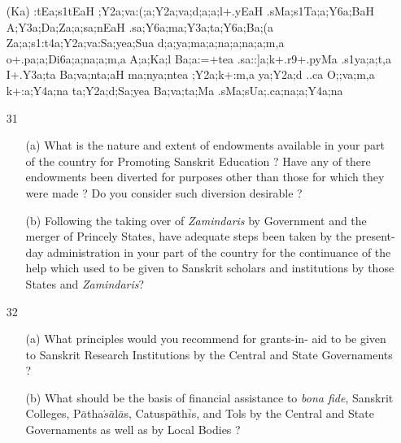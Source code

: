 \begin{itemize}
\begin{itemize}
            \item[({\sktf Ka})] {\sktf :tEa;s1tEaH
;Y2a;va:(;a;Y2a;va;d;a;a;l+.yEaH\ZF{,}
.sMa;s1Ta;a;Y6a;BaH\ZF{,} A;Y3a;Da;Za;a;sa;nEaH\ZF{,}
.sa;Y6a;ma;Y3a;ta;Y6a;Ba;(a Za;a{;s1:t4a}{;Y2a;va}:Sa;yea;Sua d;a;ya;ma;a;na;a;na;a;m,a o+.pa;a;Di6a;a;na;a;m,a
A;a;Ka;l Ba;a:=+tea .sa::]a;k+.r9+.pyMa
.s1ya;a;t,a\ZF{,} I+.Y3a;ta Ba;va;nta;aH ma;nya;ntea ;Y2a;k+:m,a
ya;Y2a;d ..ca O;;va;m,a\ZF{,} k+:a;Y4a;na {ta};Y2a;d;Sa;yea Ba;va;ta;Ma .sMa;sUa;.ca;na;a;Y4a;na}
  
            \end{itemize}                                           
\end{itemize}

{\rm 
\begin{itemize}
\item[31] \begin{itemize}
           
           \item[(a)] What is the nature and extent of endowments available in your part of the country for Promoting Sanskrit Education ? Have any of there endowments been diverted for purposes other than those for which they were made ? Do you consider such diversion desirable ? 
           
           \item[(b)] Following the taking over of {\textit {Zamindaris}} by Government and the merger of Princely States, have adequate steps been taken by the present-day administration in your part of the country for the continuance of the help which used to be given to Sanskrit scholars and institutions by those States and {\textit {Zamindaris}}?
           
          \end{itemize}
          
 \item[32] \begin{itemize}
            
            \item[(a)] What principles would you recommend for grants-in- aid to be given to Sanskrit Research Institutions by the Central and State Governaments ?
            
            \item[(b)] What should be the basis of financial assistance to {\textit {bona fide}}, Sanskrit Colleges, P$\bar{a}$tha$\acute{s}\bar{a}$l$\bar{a}$s, Catusp$\bar{a}$th$\bar{i}$s, and Tols by the Central and State Governaments as well as by Local Bodies ?
            

\end{itemize}
\end{itemize}}
